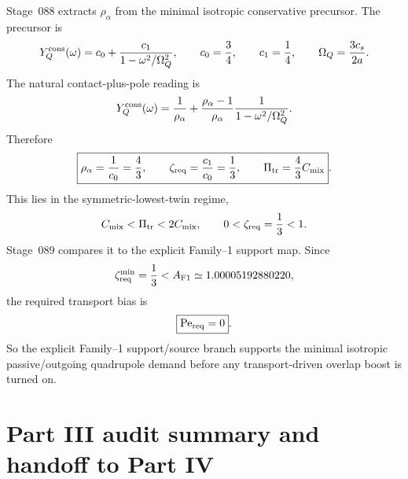 Stage~088 extracts \(\rho_\alpha\) from the minimal isotropic conservative precursor.  The precursor is
\begin{equation}
\label{eq:part03-YQ-minimal}
Y_Q^{\rm cons}(\omega)
=c_0+\frac{c_1}{1-\omega^2/\Omega_Q^2},
\qquad
c_0=\frac34,
\qquad
c_1=\frac14,
\qquad
\Omega_Q=\frac{3c_s}{2a}.
\end{equation}
The natural contact-plus-pole reading is
\begin{equation}
\label{eq:part03-contact-pole-rho}
Y_Q^{\rm cons}(\omega)
=\frac{1}{\rho_\alpha}
+\frac{\rho_\alpha-1}{\rho_\alpha}\frac{1}{1-\omega^2/\Omega_Q^2}.
\end{equation}
Therefore
\begin{equation}
\label{eq:part03-rho-minimal}
\boxed{
\rho_\alpha=\frac{1}{c_0}=\frac43,
\qquad
\zeta_{\rm req}=\frac{c_1}{c_0}=\frac13,
\qquad
\Pi_{\rm tr}=\frac43C_{\rm mix}}.
\end{equation}
This lies in the symmetric-lowest-twin regime,
\begin{equation}
\label{eq:part03-minimal-regime}
C_{\rm mix}<\Pi_{\rm tr}<2C_{\rm mix},
\qquad
0<\zeta_{\rm req}=\frac13<1.
\end{equation}
Stage~089 compares it to the explicit Family--1 support map.  Since
\begin{equation}
\label{eq:part03-zeta-min-zero-bias}
\zeta_{\rm req}^{\rm min}=\frac13<A_{\rm F1}\simeq1.00005192880220,
\end{equation}
the required transport bias is
\begin{equation}
\label{eq:part03-Pe-zero}
\boxed{
\mathrm{Pe}_{\rm req}=0}.
\end{equation}
So the explicit Family--1 support/source branch supports the minimal isotropic passive/outgoing quadrupole demand before any transport-driven overlap boost is turned on.

\section{Part III audit summary and handoff to Part IV}
\label{sec:part03-audit-summary}

